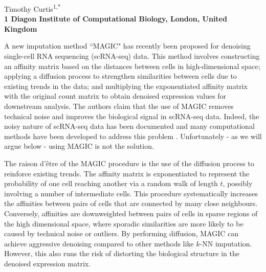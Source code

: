 \documentclass[10pt,letterpaper]{article}
\begin{document}
\vspace*{0.35in}

\begin{flushleft}
{\Large
    \textbf{}
}
\newline

Timothy Curtis\textsuperscript{1,*}
\\
\bigskip
\bf{1} Diagon Institute of Computational Biology, London, United Kingdom \\
\bigskip

\end{flushleft}

\noindent
A new imputation method ``MAGIC" \cite{vandijk2018recovering} has recently been proposed for denoising single-cell RNA sequencing (scRNA-seq) data.
This method involves constructing an affinity matrix based on the distances between cells in high-dimensional space;
applying a diffusion process to strengthen similarities between cells due to existing trends in the data;
and multiplying the exponentiated affinity matrix with the original count matrix to obtain denoised expression values for downstream analysis.
The authors claim that the use of MAGIC removes technical noise and improves the biological signal in scRNA-seq data.
Indeed, the noisy nature of scRNA-seq data has been documented \cite{grun2015design} and many computational methods have been developed to address this problem \cite{bacher2016design}.
Unfortunately - as we will argue below - using MAGIC is not the solution.

The raison d'\^etre of the MAGIC procedure is the use of the diffusion process to reinforce existing trends.
The affinity matrix is exponentiated to represent the probability of one cell reaching another via a random walk of length $t$, possibly involving a number of intermediate cells.
This procedure systematically increases the affinities between pairs of cells that are connected by many close neighbours.
Conversely, affinities are downweighted between pairs of cells in sparse regions of the high dimensional space, 
where sporadic similarities are more likely to be caused by technical noise or outliers.
By performing diffusion, MAGIC can achieve aggressive denoising compared to other methods like $k$-NN imputation.
However, this also runs the risk of distorting the biological structure in the denoised expression matrix.
\end{document}
